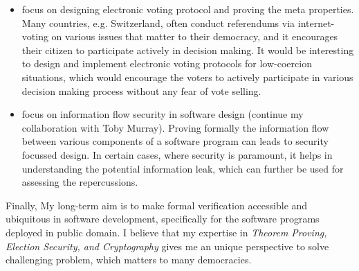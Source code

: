 \documentclass[a4paper]{article}
\begin{document}
\begin{itemize}
\item focus on designing electronic voting protocol and proving the meta properties. Many countries, e.g. Switzerland,
often conduct referendums via internet-voting on various issues that matter to their democracy, and 
it encourages their citizen to participate actively in decision making. It would be 
interesting to design and implement electronic voting protocols for low-coercion 
situations, which would  encourage the voters to actively participate in 
various decision making process without any fear of vote selling. 

\item focus on information flow security in software design (continue my collaboration with Toby Murray). 
Proving formally the information flow between various components of a software program can leads to 
security focussed design. In certain cases, where security is paramount,  
it helps in understanding the potential information leak, which can further be used 
for assessing the repercussions. 


\end{itemize}


Finally, My long-term aim is to make formal verification accessible and ubiquitous in software development, specifically for the software programs 
deployed in public domain. 
I believe that my expertise in \textit{Theorem Proving, Election Security, and Cryptography} gives me an unique perspective to solve challenging problem, which 
matters to many democracies. 
 

\end{document}
